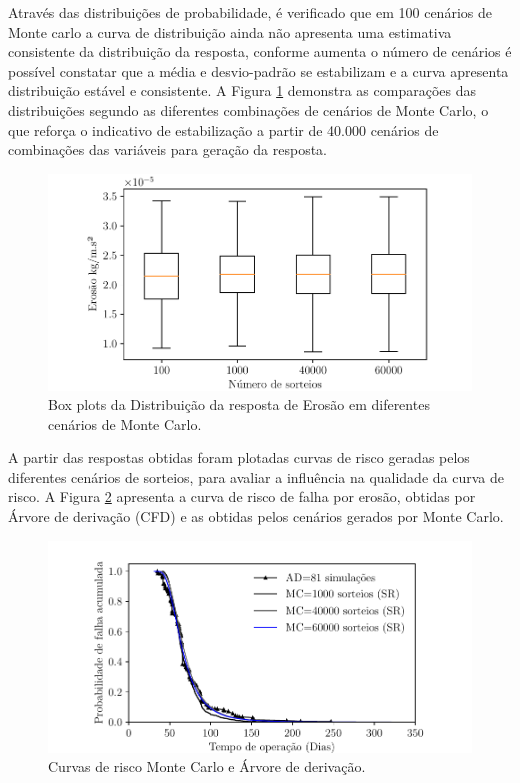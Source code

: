 Através das distribuições de probabilidade, é verificado que em 100 cenários de Monte carlo a curva de distribuição ainda não apresenta uma estimativa consistente da distribuição da resposta, conforme aumenta o número de cenários é possível constatar que a média e desvio-padrão se estabilizam e a curva apresenta distribuição estável e consistente. A Figura \ref{fig:mc222} demonstra as comparações das distribuições segundo as diferentes combinações de cenários de Monte Carlo, o que reforça o indicativo de estabilização a partir de 40.000 cenários de combinações das variáveis para geração da resposta. 


\begin{figure}[H] 
    \centering  
    \includegraphics{Figuras/boxplots.pdf}  
    \caption{Box plots da Distribuição da resposta de Erosão em diferentes cenários de Monte Carlo.}  
    \label{fig:mc222}  
\end{figure}

A partir das respostas obtidas foram plotadas curvas de risco geradas pelos diferentes cenários
de sorteios, para avaliar a influência na qualidade da curva de risco. A Figura \ref{fig:mc2} apresenta a curva de risco de falha por erosão, obtidas por Árvore de derivação (CFD) e as obtidas pelos cenários gerados por Monte Carlo.


\begin{figure}[H] 
    \centering  
    \includegraphics{Figuras/mc.pdf}  
    \caption{Curvas de risco Monte Carlo e Árvore de derivação.}  
    \label{fig:mc2}  
\end{figure}




